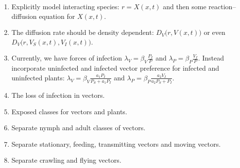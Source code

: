 \documentclass{jpmarticle}
\begin{document}
\begin{enumerate}
\item Explicitly model interacting species: $r = X(x, t)$ and then
  some reaction--diffusion equation for $X(x, t)$.
\item The diffusion rate should be density dependent:
  $D_V\big(r, V(x, t)\big)$ or even
  $D_V\big(r, V_S(x, t), V_I(x, t)\big)$.
\item Currently, we have forces of infection
  $\lambda_V = \beta_V \frac{P_I}{P}$ and
  $\lambda_P = \beta_P \frac{V_I}{P}$.  Instead incorporate uninfected
  and infected vector preference for infected and uninfected plants:
  $\lambda_V = \beta_V \frac{a_1 P_I}{P_S + a_1 P_I}$ and
  $\lambda_P = \beta_P \frac{a_2 V_I}{a_2 P_S + P_I}$.
\item The loss of infection in vectors.
\item Exposed classes for vectors and plants.
\item Separate nymph and adult classes of vectors.
\item Separate stationary, feeding, transmitting vectors and moving
  vectors.
\item Separate crawling and flying vectors.
\end{enumerate}
\end{document}

